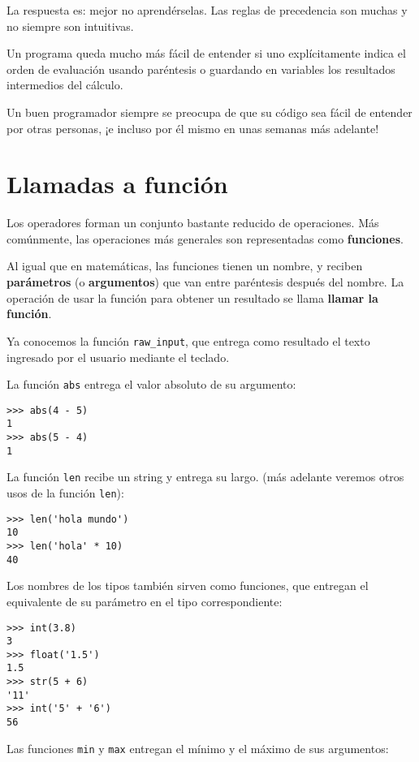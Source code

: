 La respuesta es: mejor no aprendérselas. Las reglas de precedencia son
muchas y no siempre son intuitivas.

Un programa queda mucho más fácil de entender si uno explícitamente
indica el orden de evaluación usando paréntesis o guardando en variables
los resultados intermedios del cálculo.

Un buen programador siempre se preocupa de que su código sea fácil de
entender por otras personas, ¡e incluso por él mismo en unas semanas más
adelante!

\section{Llamadas a función}

Los operadores forman un conjunto bastante reducido de operaciones. Más
comúnmente, las operaciones más generales son representadas como
\textbf{funciones}.

Al igual que en matemáticas, las funciones tienen un nombre, y reciben
\textbf{parámetros} (o \textbf{argumentos}) que van entre paréntesis
después del nombre. La operación de usar la función para obtener un
resultado se llama \textbf{llamar la función}.

Ya conocemos la función \lstinline!raw_input!, que entrega como
resultado el texto ingresado por el usuario mediante el teclado.

La función \lstinline!abs! entrega el valor absoluto de su argumento:

\begin{lstlisting}
>>> abs(4 - 5)
1
>>> abs(5 - 4)
1
\end{lstlisting}

La función \lstinline!len! recibe un string y entrega su largo. (más
adelante veremos otros usos de la función \lstinline!len!):

\begin{lstlisting}
>>> len('hola mundo')
10
>>> len('hola' * 10)
40
\end{lstlisting}

Los nombres de los tipos también sirven como funciones, que entregan el
equivalente de su parámetro en el tipo correspondiente:

\begin{lstlisting}
>>> int(3.8)
3
>>> float('1.5')
1.5
>>> str(5 + 6)
'11'
>>> int('5' + '6')
56
\end{lstlisting}

Las funciones \lstinline!min! y \lstinline!max! entregan el mínimo y el
máximo de sus argumentos:

